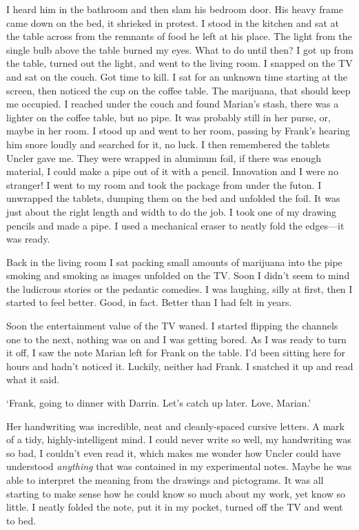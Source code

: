 \documentclass[
]{article}
\begin{document}
I heard him in the bathroom and then slam his bedroom door. His heavy
frame came down on the bed, it shrieked in protest. I stood in the
kitchen and sat at the table across from the remnants of food he left at
his place. The light from the single bulb above the table burned my
eyes. What to do until then? I got up from the table, turned out the
light, and went to the living room. I snapped on the TV and sat on the
couch. Got time to kill. I sat for an unknown time starting at the
screen, then noticed the cup on the coffee table. The marijuana, that
should keep me occupied. I reached under the couch and found Marian's
stash, there was a lighter on the coffee table, but no pipe. It was
probably still in her purse, or, maybe in her room. I stood up and went
to her room, passing by Frank's hearing him snore loudly and searched
for it, no luck. I then remembered the tablets Uncler gave me. They were
wrapped in aluminum foil, if there was enough material, I could make a
pipe out of it with a pencil. Innovation and I were no stranger! I went
to my room and took the package from under the futon. I unwrapped the
tablets, dumping them on the bed and unfolded the foil. It was just
about the right length and width to do the job. I took one of my drawing
pencils and made a pipe. I used a mechanical eraser to neatly fold the
edges---it was ready.

Back in the living room I sat packing small amounts of marijuana into
the pipe smoking and smoking as images unfolded on the TV. Soon I didn't
seem to mind the ludicrous stories or the pedantic comedies. I was
laughing, silly at first, then I started to feel better. Good, in fact.
Better than I had felt in years.

Soon the entertainment value of the TV waned. I started flipping the
channels one to the next, nothing was on and I was getting bored. As I
was ready to turn it off, I saw the note Marian left for Frank on the
table. I'd been sitting here for hours and hadn't noticed it. Luckily,
neither had Frank. I snatched it up and read what it said.

`Frank, going to dinner with Darrin. Let's catch up later. Love,
Marian.'

Her handwriting was incredible, neat and cleanly-spaced cursive letters.
A mark of a tidy, highly-intelligent mind. I could never write so well,
my handwriting was so bad, I couldn't even read it, which makes me
wonder how Uncler could have understood \emph{anything} that was
contained in my experimental notes. Maybe he was able to interpret the
meaning from the drawings and pictograms. It was all starting to make
sense how he could know so much about my work, yet know so little. I
neatly folded the note, put it in my pocket, turned off the TV and went
to bed.
\end{document}
